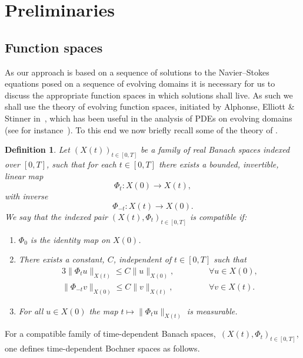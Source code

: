 \documentclass[a4paper]{amsart}
\numberwithin{equation}{section}
\theoremstyle{plain}
\newtheorem{definition}[theorem]{Definition}
\begin{document}
\section{Preliminaries}
\label{section: FSI prelim}
\subsection{Function spaces}
\label{subsection: function spaces}
As our approach is based on a sequence of solutions to the Navier--Stokes equations posed on a sequence of evolving domains it is necessary for us to discuss the appropriate function spaces in which solutions shall live.
As such we shall use the theory of evolving function spaces, initiated by Alphonse, Elliott \& Stinner in~\cite{alphonse2015abstract,Alphonse2015SomeLinear}, which has been useful in the analysis of PDEs on evolving domains (see for instance~\cite{alphonse2023function}).
To this end we now briefly recall some of the theory of \cite{alphonse2023function,alphonse2015abstract}.
\begin{definition}\label{defn: compatible family}
Let $(X(t))_{t \in [0,T]}$ be a family of real Banach spaces indexed over $[0,T]$, such that for each $t \in [0,T]$ there exists a bounded, invertible, linear map
\[  \Phi_t :X(0) \rightarrow X(t),\]
with inverse
\[ \Phi_{-t}: X(t) \rightarrow X(0). \]
We say that the indexed pair $(X(t),\Phi_t)_{t \in [0,T]}$ is compatible if:
\begin{enumerate}
	\item $\Phi_0$ is the identity map on $X(0)$.
	\item There exists a constant, $C$, independent of $t \in [0,T]$ such that
	\begin{alignat*}{3}
		\| \Phi_t u\|_{X(t)} \leq C \|u\|_{X(0)},&& \quad &&\forall u \in X(0),\\
		\| \Phi_{-t} v\|_{X(0)} \leq C \|v\|_{X(t)},&& \quad &&\forall v \in X(t).
	\end{alignat*}
	\item For all $u \in X(0)$ the map $t \mapsto \|\Phi_t u\|_{X(t)}$ is measurable.
\end{enumerate}
\end{definition}


For a compatible family of time-dependent Banach spaces,~$(X(t),\Phi_t)_{t \in [0,T]}$, one defines time-dependent Bochner spaces as follows.
\end{document}
